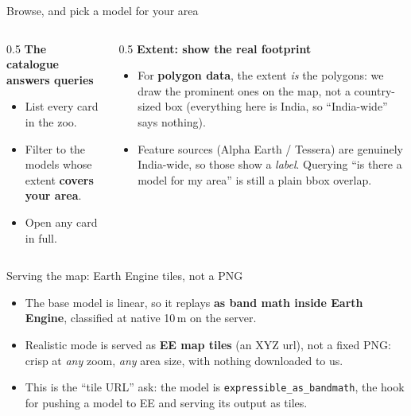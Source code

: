 \documentclass[aspectratio=169]{beamer}
\begin{document}
\begin{frame}{Browse, and pick a model for your area}
\begin{columns}[T]
\begin{column}{0.5\textwidth}
\textbf{The catalogue answers queries}
\begin{itemize}\small
  \item List every card in the zoo.
  \item Filter to the models whose extent \textbf{covers your area}.
  \item Open any card in full.
\end{itemize}
\end{column}
\begin{column}{0.5\textwidth}
\textbf{Extent: show the real footprint}
\begin{itemize}\small
  \item For \textbf{polygon data}, the extent \emph{is} the polygons: we draw the prominent ones
  on the map, not a country-sized box (everything here is India, so ``India-wide'' says nothing).
  \item Feature sources (Alpha Earth / Tessera) are genuinely India-wide, so those show a
  \emph{label}. Querying ``is there a model for my area'' is still a plain bbox overlap.
\end{itemize}
\end{column}
\end{columns}
\end{frame}

\begin{frame}{Serving the map: Earth Engine tiles, not a PNG}
\begin{itemize}
  \item The base model is linear, so it replays \textbf{as band math inside Earth Engine}, classified
  at native 10\,m on the server.
  \item Realistic mode is served as \textbf{EE map tiles} (an XYZ url), not a fixed PNG: crisp at
  \emph{any} zoom, \emph{any} area size, with nothing downloaded to us.
  \item This is the ``tile URL'' ask: the model is \texttt{expressible\_as\_bandmath}, the hook
  for pushing a model to EE and serving its output as tiles.
\end{itemize}
\end{frame}
\end{document}
